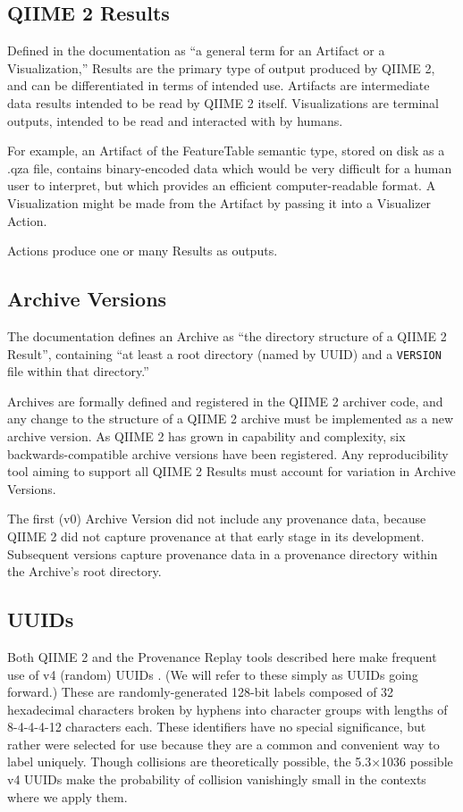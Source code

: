 \subsection{QIIME 2 Results}

Defined in the documentation as “a general term for an Artifact or a
Visualization,” Results are the primary type of output produced by QIIME 2, and
can be differentiated in terms of intended use. Artifacts are intermediate data
results intended to be read by QIIME 2 itself. Visualizations are terminal
outputs, intended to be read and interacted with by humans. 

For example, an Artifact of the FeatureTable semantic type, stored on disk as a
.qza file, contains binary-encoded data which would be very difficult for a
human user to interpret, but which provides an efficient computer-readable
format. A Visualization might be made from the Artifact by passing it into a
Visualizer Action.

Actions produce one or many Results as outputs.

\subsection{Archive Versions}

The documentation defines an Archive as “the directory structure of a QIIME 2
Result”, containing “at least a root directory (named by UUID) and a \texttt{VERSION}
file within that directory.” 

Archives are formally defined and registered in the QIIME 2 archiver code, and
any change to the structure of a QIIME 2 archive must be implemented as a new
archive version. As QIIME 2 has grown in capability and complexity, six
backwards-compatible archive versions have been registered. Any reproducibility
tool aiming to support all QIIME 2 Results must account for variation in Archive
Versions.

The first (v0) Archive Version did not include any provenance data, because
QIIME 2 did not capture provenance at that early stage in its development.
Subsequent versions capture provenance data in a provenance directory within the
Archive’s root directory.

\subsection{UUIDs}

Both QIIME 2 and the Provenance Replay tools described here make frequent use of
v4 (random) UUIDs \parencite{leach_universally_2005}.
(We will refer to these simply as UUIDs going forward.)
These are randomly-generated 128-bit labels composed of 32 hexadecimal
characters broken by hyphens into character groups with lengths of 8-4-4-4-12
characters each. These identifiers have no special significance, but rather were
selected for use because they are a common and convenient way to label uniquely.
Though collisions are theoretically possible, the 5.3×1036 possible v4 UUIDs
make the probability of collision vanishingly small in the contexts where we
apply them.

